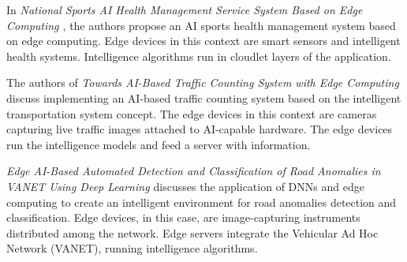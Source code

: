 
In \textit{National Sports AI Health Management Service System Based on Edge Computing \cite{yang2021national}}, the authors propose an AI sports health management system based on edge computing. Edge devices in this context are smart sensors and intelligent health systems. Intelligence algorithms run in cloudlet layers of the application.



The authors of \textit{Towards AI-Based Traffic Counting System with Edge Computing \cite{dinh2021towards}} discuss implementing an AI-based traffic counting system based on the intelligent transportation system concept. The edge devices in this context are cameras capturing live traffic images attached to AI-capable hardware. The edge devices run the intelligence models and feed a server with information.



\textit{Edge AI-Based Automated Detection and Classification of Road Anomalies in VANET Using Deep Learning \cite{bibi2021edge}} discusses the application of DNNs and edge computing to create an intelligent environment for road anomalies detection and classification. Edge devices, in this case, are image-capturing instruments distributed among the network. Edge servers integrate the Vehicular Ad Hoc Network (VANET), running intelligence algorithms.


